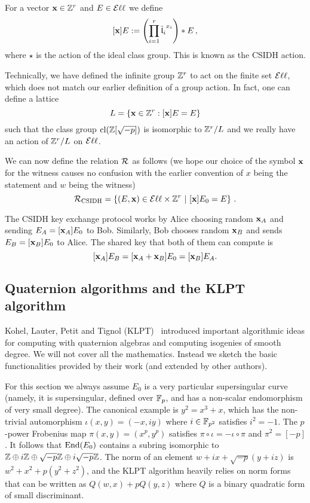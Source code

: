 For a vector $\bx \in \mathbb{Z}^r$ and $E \in \Ell$ we define \[ [\bx]E := \left( \prod_{i=1}^r {\overline{\fl}_i}^{x_i} \right) \star E  \, , \] where $\star$ is the action of the ideal class group.
This is known as the CSIDH action. 

Technically, we have defined the infinite group $\Z^r$ to act on the finite set $\Ell$, which does not match our earlier definition of a group action.
In fact, one can define a lattice
\[
  L = \{ \bx \in \Z^r : [\bx]E = E \}
\]
such that the class group $\cl( \Z[\sqrt{-p}])$ is isomorphic to $\Z^r/L$ and we really have an action of $\Z^r/L$ on $\Ell$.
 


We can now define the relation $\R$ as follows (we hope our choice of the symbol $\bx$ for the witness causes no confusion with the earlier convention of $x$ being the statement and $w$ being the witness) 
\[
\R[CSIDH] = \left\{ (E,\bx) \in \Ell \times \mathbb{Z}^r \,\, | \,\, [\bx]E_0 = E \right\} \,.
\]

The CSIDH key exchange protocol works by Alice choosing random $\bx_A$ and sending $E_A = [\bx_A]E_0$ to Bob. Similarly, Bob chooses random $\bx_B$ and sends $E_B = [\bx_B]E_0$ to Alice. The shared key that both of them can compute is
\[
  [\bx_A]E_B = [\bx_A+\bx_B]E_0 = [\bx_B]E_A.
\]


\subsection{Quaternion algorithms and the KLPT algorithm}\label{sec:KLPT}

Kohel, Lauter, Petit and Tignol (KLPT)~\cite{KLPT} introduced important algorithmic ideas for computing with quaternion algebras and computing isogenies of smooth degree.
We will not cover all the mathematics. Instead we sketch the basic functionalities provided by their work (and extended by other authors).

For this section we always assume $E_0$ is a very particular supersingular curve (namely, it is supersingular, defined over $\F_p$, and has a non-scalar endomorphism of very small degree).
The canonical example is $y^2 = x^3 + x$, which has the non-trivial automorphism $\iota(x,y) = (-x,iy)$ where $i \in \F_{p^2}$ satisfies $i^2 = -1$.
The $p$-power Frobenius map $\pi(x,y) = (x^p, y^p)$ satisfies $\pi \circ \iota = - \iota \circ \pi$ and $\pi^2 = [-p]$.
It follows that $\End(E_0)$ contains a subring isomorphic to $\Z \oplus i\Z \oplus \sqrt{-p} \Z \oplus i \sqrt{-p}\Z $.
The norm of an element $w + ix + \sqrt{-p}( y + iz)$ is $w^2 + x^2 + p( y^2 + z^2)$, and the KLPT algorithm heavily relies on norm forms that can be written as $Q(w,x) + p Q(y,z)$ where $Q$ is a binary quadratic form of small discriminant.

